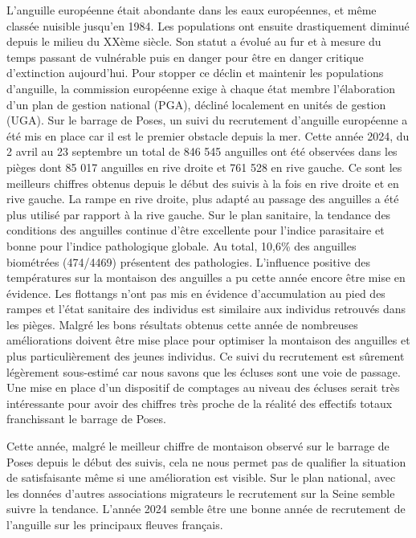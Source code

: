 \documentclass[11pt,titlepage,twoside]{article}\usepackage[]{graphicx}\usepackage[table]{xcolor}
\begin{document}
L’anguille européenne était abondante dans les eaux européennes, et même classée nuisible jusqu’en 1984. Les populations ont ensuite drastiquement diminué depuis le milieu du XXème siècle. Son statut a évolué au fur et à mesure du temps passant de \og vulnérable \fg{} puis \og en danger \fg{} pour être \og en danger critique d’extinction \fg{} aujourd’hui. Pour stopper ce déclin et maintenir les populations d’anguille, la commission européenne exige à chaque état membre l’élaboration d’un plan de gestion national (PGA), décliné localement en unités de gestion (UGA). Sur le barrage de Poses, un suivi du recrutement d’anguille européenne a été mis en place car il est le premier obstacle depuis la mer. Cette année 2024, du 2 avril au 23 septembre un total de 846 545 anguilles ont été observées dans les pièges dont 85 017 anguilles en rive droite et 761 528 en rive gauche. Ce sont les meilleurs chiffres obtenus depuis le début des suivis à la fois en rive droite et en rive gauche. La rampe en rive droite, plus adapté au passage des anguilles a été plus utilisé par rapport à la rive gauche. Sur le plan sanitaire, la tendance des conditions des anguilles continue d’être excellente pour l’indice parasitaire et bonne pour l’indice pathologique globale. Au total, 10,6\% des anguilles biométrées (474/4469) présentent des pathologies. L’influence positive des températures sur la montaison des anguilles a pu cette année encore être mise en évidence. Les flottangs n’ont pas mis en évidence d’accumulation au pied des rampes et l’état sanitaire des individus est similaire aux individus retrouvés dans les pièges. Malgré les bons résultats obtenus cette année de nombreuses améliorations doivent être mise place pour optimiser la montaison des anguilles et plus particulièrement des jeunes individus. Ce suivi du recrutement est sûrement légèrement sous-estimé car nous savons que les écluses sont une voie de passage. Une mise en place d’un dispositif de comptages au niveau des écluses serait très intéressante pour avoir des chiffres très proche de la réalité des effectifs totaux franchissant le barrage de Poses.

\vspace{0.5cm}
Cette année, malgré le meilleur chiffre de montaison observé sur le barrage de Poses depuis le début des suivis, cela ne nous permet pas de qualifier la situation de satisfaisante même si une amélioration est visible. Sur le plan national, avec les données d’autres associations migrateurs le recrutement sur la Seine semble suivre la tendance. L’année 2024 semble être une bonne année de recrutement de l’anguille sur les principaux fleuves français.





\normalsize
\null
\vfill
\end{document}

